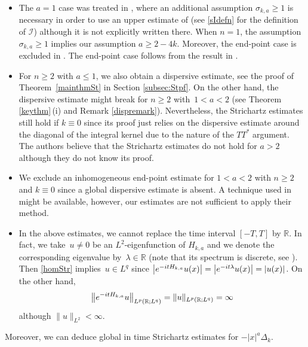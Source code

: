 \documentclass[10pt,a4paper]{article}
\numberwithin{equation}{section}
\def\R{\mathbb{R}}%
\def\l{\lambda}
\def\s{\sigma}
\newcommand{\sI}{\mathscr{I}}
\begin{document}
\begin{Remark}\label{rem:mainthmrem}\quad
\begin{itemize}\itemsep=0pt
\item[(1)]
The $a=1$ case was treated in \cite{B}, where an additional assumption $\s_{k,a}\ge 1$ is necessary in order to use an upper estimate of \smash{$\sI\bigl(2,\frac{\s_{k,a}-1}{2};w;t\bigr)$} \cite[Proposition 4.26]{BKO} (see \eqref{sIdefn} for the definition of $\sI$) although it is not explicitly written there. When $n=1$, the assumption~${\s_{k,a}\ge 1}$ implies our assumption $a\ge 2-4k$. Moreover, the end-point case \smash{$\bigl(2,\frac{2\s_{k,a}}{\s_{k,a}-1}\bigr)$} is excluded in \cite{B}.
The end-point case follows from the result in \cite{KT}.

\item[(2)] For $n\geq 2$ with $a\leq 1$, we also obtain a dispersive estimate, see the proof of Theorem~\ref{mainthmSt} in Section \ref{subsec:Stpf}. On the other hand, the dispersive estimate might break for $n\geq 2$ with~${1<a<2}$ (see Theorem \ref{keythm}\,(i) and Remark \ref{dispremark}). Nevertheless, the Strichartz estimates still hold if $k\equiv 0$ since its proof just relies on the dispersive estimate around the diagonal of the integral kernel due to the nature of the $TT^*$ argument. The authors believe that the Strichartz estimates do not hold for $a>2$ although they do not know its proof.


\item[(3)] We exclude an inhomogeneous end-point estimate for $1<a<2$ with $n\geq 2$ and $k\equiv 0$ since a global dispersive estimate is absent. A technique used in \cite{HZ,ZZ} might be available, however, our estimates are not sufficient to apply their method.

\item[(4)] In the above estimates, we cannot replace the time interval $[-T,T]$ by $\R$. In fact, we take~${u\neq 0}$ be an $L^2$-eigenfunction of $H_{k,a}$ and we denote the corresponding eigenvalue by~${\l\in \R}$ (note that its spectrum is discrete, see \cite[Corollary 3.22]{BKO}). Then \eqref{homStr} implies~${u\in L^q}$ since $\big|{\rm e}^{-{\rm i}tH_{k,a}}u(x)\big|=\big|{\rm e}^{-{\rm i}t\l}u(x)\big|=|u(x)|$. On the other hand,
 \[
 \big\|{\rm e}^{-{\rm i}tH_{k,a}}u\big\|_{L^{p}(\R;L^q)}=\|u\|_{L^{p}(\R;L^q)}=\infty\] although $\|u\|_{L^2}<\infty$.
\end{itemize}
\end{Remark}

Moreover, we can deduce global in time Strichartz estimates for $-|x|^a\Delta_{k}$.
\end{document}
